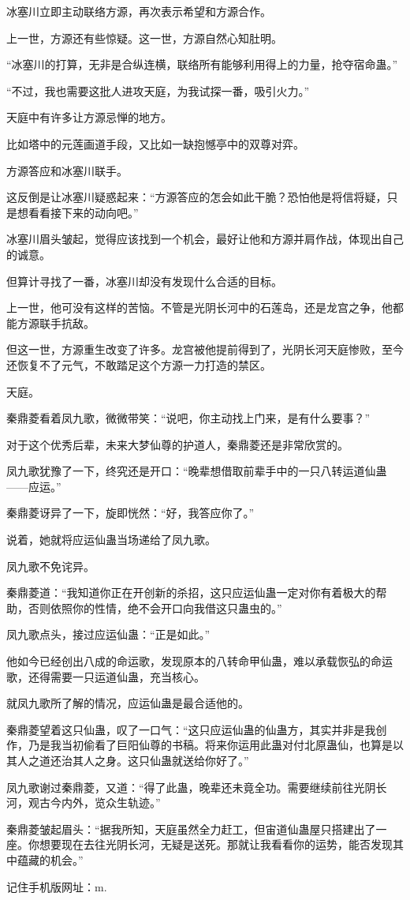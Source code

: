 \begin{this_body}
冰塞川立即主动联络方源，再次表示希望和方源合作。

上一世，方源还有些惊疑。这一世，方源自然心知肚明。

“冰塞川的打算，无非是合纵连横，联络所有能够利用得上的力量，抢夺宿命蛊。”

“不过，我也需要这批人进攻天庭，为我试探一番，吸引火力。”

天庭中有许多让方源忌惮的地方。

比如塔中的元莲画道手段，又比如一缺抱憾亭中的双尊对弈。

方源答应和冰塞川联手。

这反倒是让冰塞川疑惑起来：“方源答应的怎会如此干脆？恐怕他是将信将疑，只是想看看接下来的动向吧。”

冰塞川眉头皱起，觉得应该找到一个机会，最好让他和方源并肩作战，体现出自己的诚意。

但算计寻找了一番，冰塞川却没有发现什么合适的目标。

上一世，他可没有这样的苦恼。不管是光阴长河中的石莲岛，还是龙宫之争，他都能方源联手抗敌。

但这一世，方源重生改变了许多。龙宫被他提前得到了，光阴长河天庭惨败，至今还恢复不了元气，不敢踏足这个方源一力打造的禁区。

天庭。

秦鼎菱看着凤九歌，微微带笑：“说吧，你主动找上门来，是有什么要事？”

对于这个优秀后辈，未来大梦仙尊的护道人，秦鼎菱还是非常欣赏的。

凤九歌犹豫了一下，终究还是开口：“晚辈想借取前辈手中的一只八转运道仙蛊——应运。”

秦鼎菱讶异了一下，旋即恍然：“好，我答应你了。”

说着，她就将应运仙蛊当场递给了凤九歌。

凤九歌不免诧异。

秦鼎菱道：“我知道你正在开创新的杀招，这只应运仙蛊一定对你有着极大的帮助，否则依照你的性情，绝不会开口向我借这只蛊虫的。”

凤九歌点头，接过应运仙蛊：“正是如此。”

他如今已经创出八成的命运歌，发现原本的八转命甲仙蛊，难以承载恢弘的命运歌，还得需要一只运道仙蛊，充当核心。

就凤九歌所了解的情况，应运仙蛊是最合适他的。

秦鼎菱望着这只仙蛊，叹了一口气：“这只应运仙蛊的仙蛊方，其实并非是我创作，乃是我当初偷看了巨阳仙尊的书稿。将来你运用此蛊对付北原蛊仙，也算是以其人之道还治其人之身。这只仙蛊就送给你好了。”

凤九歌谢过秦鼎菱，又道：“得了此蛊，晚辈还未竟全功。需要继续前往光阴长河，观古今内外，览众生轨迹。”

秦鼎菱皱起眉头：“据我所知，天庭虽然全力赶工，但宙道仙蛊屋只搭建出了一座。你想要现在去往光阴长河，无疑是送死。那就让我看看你的运势，能否发现其中蕴藏的机会。”

记住手机版网址：m.

\end{this_body}

